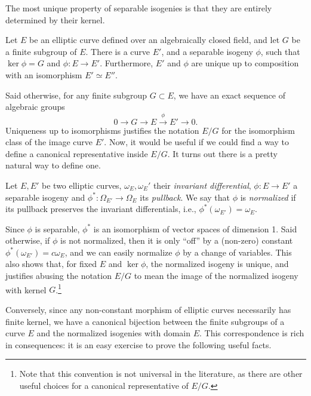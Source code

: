 \documentclass[b5layout]{hdr}
\begin{document}
The most unique property of separable isogenies is that they are 
entirely determined by their kernel. %

\begin{proposition}
  Let $E$ be an elliptic curve defined over an algebraically closed
  field, and let $G$ be a finite subgroup of $E$. %
  There is a curve $E'$, and a separable isogeny $ϕ$, such that
  $\ker ϕ=G$ and $ϕ:E→ E'$. %
  Furthermore, $E'$ and $ϕ$ are unique up to composition with an
  isomorphism $E'≃E''$. %
\end{proposition}

Said otherwise, for any finite subgroup $G⊂E$, we have an exact
sequence of algebraic groups
\begin{equation*}
  0 → G → E \overset{ϕ}{→} E' → 0.
\end{equation*}
Uniqueness up to isomorphisms justifies the notation $E/G$ for the
isomorphism class of the image curve $E'$. %
Now, it would be useful if we could find a way to define a canonical
representative inside $E/G$. %
It turns out there is a pretty natural way to define one.

\begin{definition}
  Let $E,E'$ be two elliptic curves, $ω_E,ω_E'$ their \emph{invariant
    differential}, $ϕ:E→ E'$ a separable isogeny and
  $ϕ^*:Ω_{E'}→ Ω_E$ its \emph{pullback}. %
  We say that $ϕ$ is \emph{normalized} if its pullback preserves the
  invariant differentials, i.e., $ϕ^*(ω_{E'})=ω_E$. %
\end{definition}

Since $ϕ$ is separable, $ϕ^*$ is an isomorphism of vector spaces of
dimension 1. %
Said otherwise, if $ϕ$ is not normalized, then it is only ``off'' by a
(non-zero) constant $ϕ^*(ω_{E'})=cω_E$, and we can easily normalize
$ϕ$ by a change of variables. %
This also shows that, for fixed $E$ and $\ker ϕ$, the normalized
isogeny is unique, and justifies abusing the notation $E/G$ to mean
the image of the normalized isogeny with kernel $G$.\footnote{Note
  that this convention is not universal in the literature, as there
  are other useful choices for a canonical representative of $E/G$.}

Conversely, since any non-constant morphism of elliptic curves
necessarily has finite kernel, we have a canonical bijection between
the finite subgroups of a curve $E$ and the normalized isogenies with
domain $E$. %
This correspondence is rich in consequences: it is an easy exercise to
prove the following useful facts. %
\end{document}
